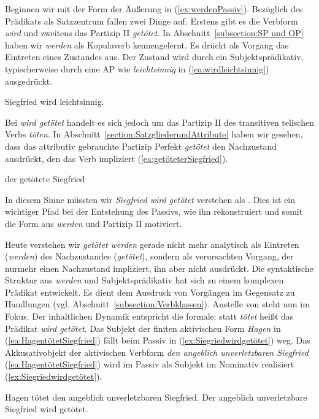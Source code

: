Beginnen wir mit der Form der Äußerung in (\ref{ex:werdenPassiv}). Bezüglich des Prädikats als Satzzentrum fallen zwei Dinge auf. Erstens gibt es die Verbform \textit{wird} und zweitens das Partizip II \textit{getötet}. In Abschnitt~\ref{subsection:SP und OP} haben wir \textit{werden} als Kopulaverb kennengelernt. Es drückt als Vorgang das Eintreten eines Zustandes aus. Der Zustand wird durch ein Subjektsprädikativ, typischerweise durch eine AP wie \textit{leichtsinnig} in (\ref{ea:wirdleichtsinnig}) ausgedrückt.  

\ea \label{ea:wirdleichtsinnig} Siegfried wird leichtsinnig.
\z 

Bei \textit{wird getötet} handelt es sich jedoch um das Partizip II des transitiven telischen Verbs \textit{töten}. In Abschnitt~\ref{section:SatzgliederundAttribute} haben wir gesehen, dass das attributiv gebrauchte Partizip Perfekt \textit{getötet} den Nachzustand ausdrückt, den das Verb impliziert (\ref{ea:getöteterSiegfried}). 

\ea \label{ea:getöteterSiegfried} der getötete Siegfried
\z 

\newpage
In diesem Sinne müssten wir \textit{Siegfried wird getötet} verstehen als . Dies ist ein wichtiger Pfad bei der Entstehung des Passivs, wie ihn \citet[81--83]{Welke2012} rekonstruiert und somit die Form aus \textit{werden} und Partizip II motiviert. 

Heute verstehen wir \textit{getötet werden} gerade nicht mehr analytisch als Eintreten (\textit{werden}) des Nachzustandes (\textit{getötet}), sondern als verursachten Vorgang, der nurmehr einen Nachzustand impliziert, ihn aber nicht ausdrückt. Die syntaktische Struktur aus \textit{werden} und Subjektsprädikativ hat sich zu einem komplexen Prädikat entwickelt. Es dient dem Ausdruck von Vorgängen im Gegensatz zu Handlungen (vgl. Abschnitt~\ref{subsection:Verbklassen}). Anstelle von  steht nun  im Fokus. Der inhaltlichen Dynamik entspricht die formale: statt \textit{tötet} heißt das Prädikat \textit{wird getötet}. Das Subjekt der finiten aktivischen Form \textit{\textit{Hagen}} in (\ref{ea:HagentötetSiegfried}) fällt beim Passiv in (\ref{ex:Siegriedwirdgetötet}) weg. Das Akkusativobjekt der aktivischen Verbform \textit{den angeblich unverletzbaren Siegfried} (\ref{ea:HagentötetSiegfried}) wird im Passiv als Subjekt im Nominativ realisiert (\ref{ex:Siegriedwirdgetötet}).    

\ea \label{ea:tötenAktPass}
\ea \label{ea:HagentötetSiegfried} Hagen tötet den angeblich unverletzbaren Siegfried.
\ex \label{ex:Siegriedwirdgetötet} Der angeblich unverletzbare Siegfried wird getötet.
\z 
\z 


